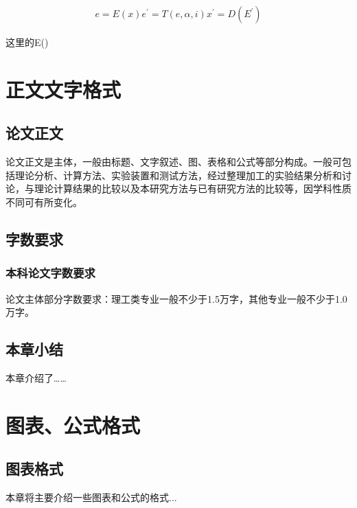 \documentclass[UTF8,a4paper,12pt]{ctexart}
\numberwithin{equation}{section}
\begin{document}
\begin{eqnarray}
\label{encode模型}
    e = E(x)
    e^' = T(e, \alpha, i)
    x^' = D(E^')
\end{eqnarray}

这里的E()















\newpage
{}

\section{正文文字格式}
\subsection{论文正文}
论文正文是主体，一般由标题、文字叙述、图、表格和公式等部分构成。一般可包括理论分析、计算方法、实验装置和测试方法，经过整理加工的实验结果分析和讨论，与理论计算结果的比较以及本研究方法与已有研究方法的比较等，因学科性质不同可有所变化。\par

\subsection{字数要求}
\subsubsection{本科论文字数要求}
论文主体部分字数要求：理工类专业一般不少于1.5万字，其他专业一般不少于1.0万字。

\subsection{本章小结}
本章介绍了……

\newpage
{}

\section{图表、公式格式}
\subsection{图表格式}
本章将主要介绍一些图表和公式的格式...\\
\end{document}
